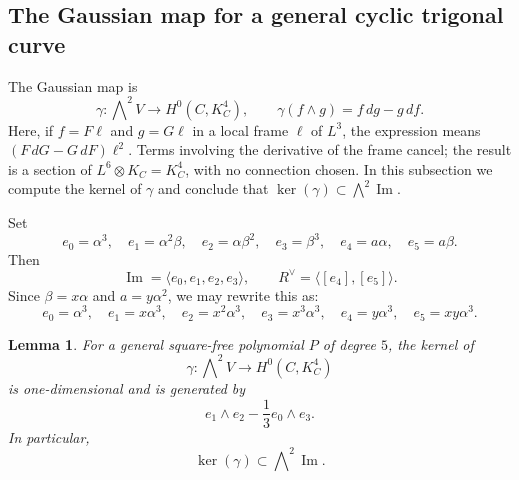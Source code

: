 \documentclass[10pt,a4paper]{amsart}
\newtheorem{lemma}[theorem]{Lemma}
\begin{document}
\subsection{The Gaussian map for a general cyclic trigonal curve}
\label{subsec:gaussian-general-cyclic}

The Gaussian map is
\begin{equation}
\label{old:eq:gaussian-map}
\gamma:
\bigwedge\nolimits^2V
\longrightarrow
H^0(C,K_C^4),
\qquad
\gamma(f\wedge g)=f\,dg-g\,df.
\end{equation}
{Here, if $f=F\ell$ and $g=G\ell$ in a local frame $\ell$ of $L^3$,
the expression means $(F\,dG-G\,dF)\ell^2$. Terms involving the
derivative of the frame cancel; the result is a section of
$L^6\otimes K_C=K_C^4$, with no connection chosen.}
In this subsection we compute the kernel of $\gamma$ and conclude that
$\ker(\gamma)\subset\bigwedge\nolimits^2\operatorname{Im}.$


Set
\begin{equation*}
e_0=\alpha^3,
\quad
e_1=\alpha^2\beta,
\quad
e_2=\alpha\beta^2,
\quad
e_3=\beta^3,
\quad
e_4=a\alpha,
\quad
e_5=a\beta.
\end{equation*}
Then
\begin{equation*}
\operatorname{Im}=\langle e_0,e_1,e_2,e_3\rangle,
\qquad
R^\vee=\langle[e_4],[e_5]\rangle.
\end{equation*}
Since $\beta=x\alpha$ and $a=y\alpha^2$, we may rewrite this as:
\begin{equation*}
e_0=\alpha^3,
\quad
e_1=x\alpha^3,
\quad
e_2=x^2\alpha^3,
\quad
e_3=x^3\alpha^3,
\quad
e_4=y\alpha^3,
\quad
e_5=xy\alpha^3.
\end{equation*}

\begin{lemma}
\label{lem:gaussian-kernel-cyclic}
For a general square-free polynomial $P$ of degree $5$, the kernel of
\begin{equation*}
\gamma:\bigwedge\nolimits^2V\longrightarrow H^0(C,K_C^4)
\end{equation*}
is one-dimensional and is generated by
\begin{equation}
\label{eq:gaussian-kernel-generator}
e_1\wedge e_2-\frac13e_0\wedge e_3.
\end{equation}
In particular,
\begin{equation*}
\ker(\gamma)\subset\bigwedge\nolimits^2\operatorname{Im}.
\end{equation*}
\end{lemma}
\end{document}
